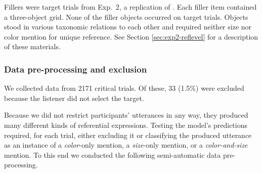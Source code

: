 \documentclass[11pt]{article}
\newcommand{\red}[1]{\textcolor{Red}{#1}}
\newcommand{\sectionref}[1]{Section \ref{#1}}
\begin{document}
Fillers were target trials from Exp.~2, a replication of \cite{graf2016}. Each filler item contained a three-object grid. None of the filler objects occurred on target trials. Objects stood in various taxonomic relations to each other and required neither size nor color mention for unique reference. See \sectionref{sec:exp2-reflevel} for a description of these materials.

\subsubsection{Data pre-processing and exclusion}

We collected data from 2171 critical trials. Of these, 33 (1.5\%) were excluded because the listener did not select the target. 

Because we did not restrict participants' utterances in any way, they produced many different kinds of referential expressions. Testing the model's predictions required, for each trial, either excluding it or classifying the produced utterance as an instance of a \emph{color}-only mention, a \emph{size}-only mention, or a \emph{color-and-size} mention. To this end we conducted the following semi-automatic data pre-processing. 

\end{document}
